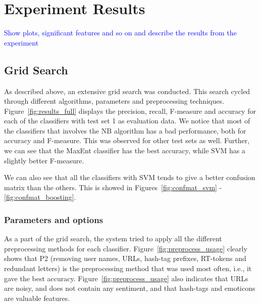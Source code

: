 \section{Experiment Results}
\textcolor{blue}{Show plots, significant features and so on and describe the results from the experiment}

\subsection{Grid Search}
As described above, an extensive grid search was conducted. This search cycled through different algorithms, parameters and preprocessing techniques. Figure~\ref{fig:results_full} displays the precision, recall, F-measure and accuracy for each of the classifiers with test set 1 as evaluation data. We notice that most of the classifiers that involves the NB algorithm has a bad performance, both for accuracy and F-measure. This was observed for other test sets as well. Further, we can see that the MaxEnt classifier has the best accuracy, while SVM has a slightly better F-measure.

We can also see that all the classifiers with SVM tends to give a better confusion matrix than the others. This is showed in Figures~\ref{fig:confmat_svm} - \ref{fig:confmat_boosting}.

\subsubsection{Parameters and options}
As a part of the grid search, the system tried to apply all the different preprocessing methods for each classifier. Figure~\ref{fig:preprocess_usage} clearly shows that P2 (removing user names, URLs, hash-tag prefixes, RT-tokens and redundant letters) is the preprocessing method that was used most often, i.e., it gave the best accuracy. Figure~\ref{fig:preprocess_usage} also indicates that URLs are noisy, and does not contain any sentiment, and that hash-tags and emoticons are valuable features.


